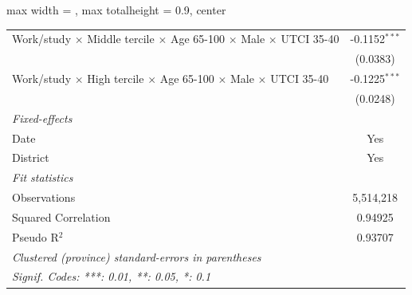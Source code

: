 \begin{table}[htbp]
\begin{adjustbox}{max width = \textwidth, max totalheight = 0.9\textheight, center}
\begin{tabular}{lc}
         Work/study $\times$ Middle tercile $\times$ Age 65-100 $\times$ Male $\times$ UTCI 35-40       & -0.1152$^{***}$\\   
                                                                                                        & (0.0383)\\   
         Work/study $\times$ High tercile $\times$ Age 65-100 $\times$ Male $\times$ UTCI 35-40         & -0.1225$^{***}$\\   
                                                                                                        & (0.0248)\\   
         \midrule
         \emph{Fixed-effects}\\
         Date                                                                                           & Yes\\  
         District                                                                                       & Yes\\  
         \midrule
         \emph{Fit statistics}\\
         Observations                                                                                   & 5,514,218\\  
         Squared Correlation                                                                            & 0.94925\\  
         Pseudo R$^2$                                                                                   & 0.93707\\  
         \midrule \midrule
         \multicolumn{2}{l}{\emph{Clustered (province) standard-errors in parentheses}}\\
         \multicolumn{2}{l}{\emph{Signif. Codes: ***: 0.01, **: 0.05, *: 0.1}}\\
      \end{tabular}
   \end{adjustbox}
\end{table}


